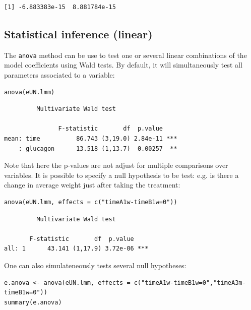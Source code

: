 \documentclass[12pt]{article}
\begin{document}
\begin{verbatim}
[1] -6.883383e-15  8.881784e-15
\end{verbatim}


\clearpage

\subsection{Statistical inference (linear)}
\label{sec:orge342e94}

The \texttt{anova} method can be use to test one or several linear
combinations of the model coefficients using Wald tests. By default,
it will simultaneously test all parameters associated to a variable:
\lstset{language=r,label= ,caption= ,captionpos=b,numbers=none}
\begin{lstlisting}
anova(eUN.lmm)
\end{lstlisting}

\begin{verbatim}
	     Multivariate Wald test 

               F-statistic       df  p.value    
mean: time          86.743 (3,19.0) 2.84e-11 ***
    : glucagon      13.518 (1,13.7)  0.00257  **
\end{verbatim}


Note that here the p-values are not adjust for multiple comparisons
over variables. It is possible to specify a null hypothesis to be
test: e.g. is there a change in average weight just after taking the
treatment:
\lstset{language=r,label= ,caption= ,captionpos=b,numbers=none}
\begin{lstlisting}
anova(eUN.lmm, effects = c("timeA1w-timeB1w=0"))
\end{lstlisting}

\begin{verbatim}
	     Multivariate Wald test 

       F-statistic       df  p.value    
all: 1      43.141 (1,17.9) 3.72e-06 ***
\end{verbatim}


One can also simulateneously tests several null hypotheses:
\lstset{language=r,label= ,caption= ,captionpos=b,numbers=none}
\begin{lstlisting}
e.anova <- anova(eUN.lmm, effects = c("timeA1w-timeB1w=0","timeA3m-timeB1w=0"))
summary(e.anova)
\end{lstlisting}
\end{document}
